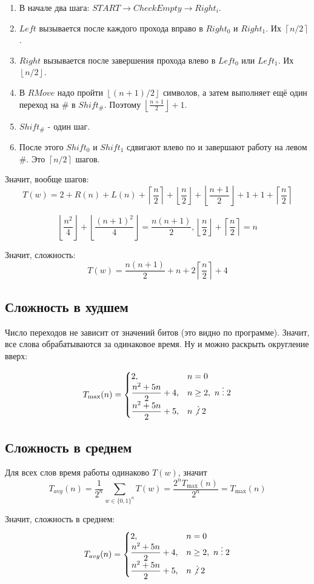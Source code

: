 \documentclass[12pt]{article}
\begin{document}
\begin{enumerate}
\item В начале два шага: $START\to CheckEmpty\to Right_i$.

\item $Left$ вызывается после каждого прохода вправо
в $Right_0$ и $Right_1$. Их $\left\lceil n/2\right\rceil$.

\item $Right$ вызывается после завершения прохода влево
в $Left_0$ или $Left_1$. Их $\left\lfloor n/2\right\rfloor$.

\item В $RMove$ надо пройти
$\left\lfloor(n+1)/2\right\rfloor$ символов,
а затем выполняет ещё один переход на $\#$ в $Shift_\#$. 
Поэтому $\left\lfloor\frac{n+1}{2}\right\rfloor+1$.

\item $Shift_\#$ - один шаг.

\item После этого $Shift_0$ и $Shift_1$ сдвигают
влево по и завершают работу на левом \#.
Это $\left\lceil n/2\right\rceil$ шагов.
\end{enumerate}

Значит, вообще шагов:
\[
T(w)=2+R(n)+L(n)
+\left\lceil\frac n2\right\rceil
+\left\lfloor\frac n2\right\rfloor
+\left\lfloor\frac{n+1}{2}\right\rfloor+1+1
+\left\lceil\frac n2\right\rceil
\]

\[
\left\lfloor\frac{n^2}{4}\right\rfloor
+\left\lfloor\frac{(n+1)^2}{4}\right\rfloor
=\frac{n(n+1)}2,
\left\lfloor\frac n2\right\rfloor
+\left\lceil\frac n2\right\rceil=n
\]

Значит, сложность:
\[
T(w)=\frac{n(n+1)}2+n+2\left\lceil\frac n2\right\rceil+4
\]

\subsection*{Сложность в худшем}

Число переходов не зависит от значений битов (это видно по программе).
Значит, все слова обрабатываются за одинаковое время.
Ну и можно раскрыть округление вверх:

\[
T_{\max}(n)=
\begin{cases}
2, & n=0\\
\dfrac{n^2+5n}{2}+4, & n\geq 2,\ n\;\vdots\; 2\\
\dfrac{n^2+5n}{2}+5, & n\not\vdots\; 2
\end{cases}
\]

\subsection*{Сложность в среднем}

Для всех слов время работы одинаково $T(w)$, значит
\[
T_{avg}(n)
=\frac{1}{2^n}\sum_{w\in\{0,1\}^n}T(w)
=\frac{2^nT_{\max}(n)}{2^n}
=T_{\max}(n)
\]

Значит, сложность в среднем:
\[
T_{avg}(n)=
\begin{cases}
2, & n=0\\
\dfrac{n^2+5n}{2}+4, & n\geq 2,\ n\;\vdots\; 2\\
\dfrac{n^2+5n}{2}+5, & n\not\vdots\; 2
\end{cases}
\]
\end{document}
